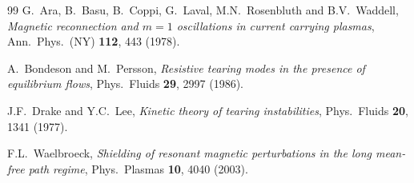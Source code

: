 \documentclass[12pt,prb,aps]{revtex4-1}
\begin{document}
\begin{thebibliography}{99}
 G.~Ara, B.~Basu, B.~Coppi, G.~Laval, M.N.~Rosenbluth and B.V.~Waddell, {\em Magnetic reconnection and $m = 1$ oscillations in current carrying plasmas}, Ann.\ Phys.\ (NY) {\bf 112}, 443 (1978).

 A.~Bondeson and M.~Persson, {\em Resistive tearing modes in the presence of equilibrium flows}, Phys.\ Fluids {\bf 29}, 2997 (1986).

 J.F.~Drake and Y.C.~Lee,  {\em Kinetic theory of tearing instabilities}, Phys.\ Fluids {\bf 20}, 1341 (1977).

 F.L.~Waelbroeck, {\em Shielding of resonant magnetic perturbations in the long mean-free path regime}, Phys.\ Plasmas {\bf 10}, 4040 (2003).
\end{thebibliography}
\end{document}
